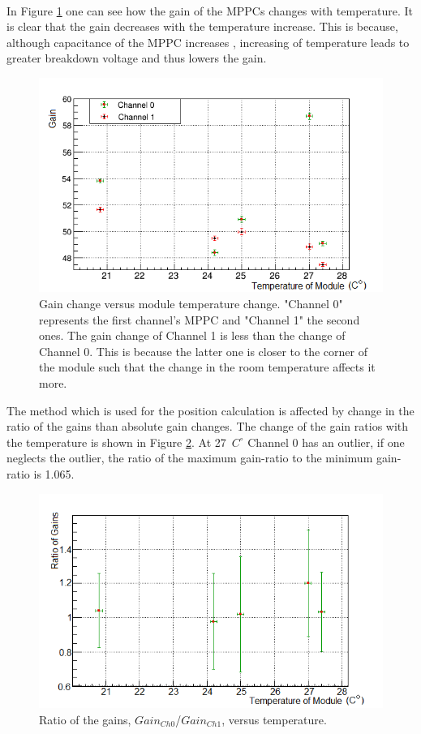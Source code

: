 \documentclass[a4paper]{article}\linespread{1.4}
\begin{document}
\\In Figure \ref{fig:mea} one can see how the gain of the MPPCs changes with temperature. It is clear that the gain decreases with the temperature increase. This is because, although capacitance of the MPPC increases \cite{123}, increasing of temperature leads to greater breakdown voltage \cite{1234} and thus lowers the gain.
\begin{figure}[] \centering \includegraphics[width=130mm,scale=1.0]{rvsm.png} \caption{Gain change versus module temperature change. "Channel 0"  represents the first channel's MPPC and "Channel 1" the second ones. The gain change of Channel 1 is less than the change of Channel 0. This is because the latter one is closer to the corner of the module such that the change in the room temperature affects it more.} \label{fig:mea} \end{figure}  

The method which is used for the position calculation is affected by change in the ratio of the gains than absolute gain changes. The change of the gain ratios with the temperature is shown in Figure \ref{fig:ratio}. At 27~$C^{\circ}$ Channel 0 has an outlier, if one neglects the outlier, the ratio of the maximum gain-ratio to the minimum gain-ratio is 1.065.
 \begin{figure}[] \centering \includegraphics[width=130mm,scale=1.0]{ratiot.png} \caption{Ratio of the gains, $Gain_{Ch0}$/$Gain_{Ch1}$, versus temperature.} \label{fig:ratio} \end{figure}  
\end{document}
